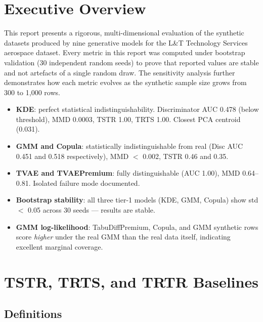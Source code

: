 \documentclass[12pt,a4paper]{article}
\begin{document}
\section{Executive Overview}

This report presents a rigorous, multi-dimensional evaluation of the synthetic datasets produced by nine generative models for the L\&T Technology Services aerospace dataset. Every metric in this report was computed under bootstrap validation (30 independent random seeds) to prove that reported values are stable and not artefacts of a single random draw. The sensitivity analysis further demonstrates how each metric evolves as the synthetic sample size grows from 300 to 1,000 rows.

\begin{tcolorbox}[successbox, title={Top-Line Findings}]
\begin{itemize}[noitemsep]
  \item \textbf{KDE}: perfect statistical indistinguishability. Discriminator AUC 0.478 (below threshold), MMD 0.0003, TSTR 1.00, TRTS 1.00. Closest PCA centroid (0.031).
  \item \textbf{GMM and Copula}: statistically indistinguishable from real (Disc AUC 0.451 and 0.518 respectively), MMD $<$ 0.002, TSTR 0.46 and 0.35.
  \item \textbf{TVAE and TVAEPremium}: fully distinguishable (AUC 1.00), MMD 0.64--0.81. Isolated failure mode documented.
  \item \textbf{Bootstrap stability}: all three tier-1 models (KDE, GMM, Copula) show std $<$ 0.05 across 30 seeds --- results are stable.
  \item \textbf{GMM log-likelihood}: TabuDiffPremium, Copula, and GMM synthetic rows score \emph{higher} under the real GMM than the real data itself, indicating excellent marginal coverage.
\end{itemize}
\end{tcolorbox}

\section{TSTR, TRTS, and TRTR Baselines}

\subsection{Definitions}
\end{document}
